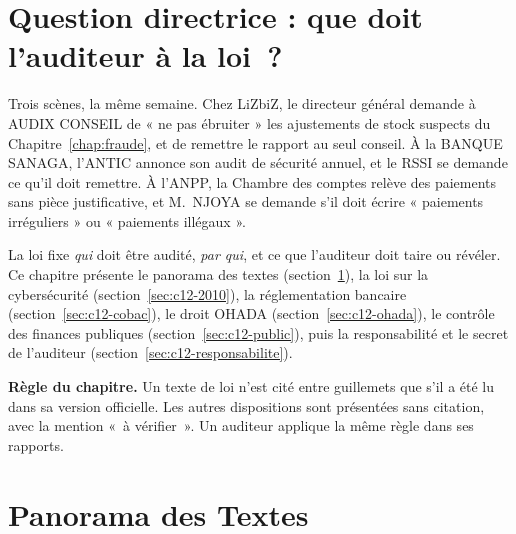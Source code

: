 \bigskip

\section*{Question directrice : que doit l'auditeur à la loi~?}

Trois scènes, la même semaine. Chez LiZbiZ, le directeur général demande à
AUDIX CONSEIL de « ne pas ébruiter » les ajustements de stock suspects
du Chapitre~\ref{chap:fraude}, et de remettre le rapport au seul conseil.
À la BANQUE SANAGA, l'ANTIC annonce son audit de sécurité annuel, et le RSSI
se demande ce qu'il doit remettre. À l'ANPP, la Chambre des comptes relève
des paiements sans pièce justificative, et M.~NJOYA se demande s'il doit
écrire « paiements irréguliers » ou « paiements illégaux ».

La loi fixe \emph{qui} doit être audité, \emph{par qui}, et ce que l'auditeur
doit taire ou révéler. Ce chapitre présente le panorama des textes
(section~\ref{sec:c12-panorama}), la loi sur la cybersécurité
(section~\ref{sec:c12-2010}), la réglementation bancaire
(section~\ref{sec:c12-cobac}), le droit OHADA
(section~\ref{sec:c12-ohada}), le contrôle des finances publiques
(section~\ref{sec:c12-public}), puis la responsabilité et le secret de
l'auditeur (section~\ref{sec:c12-responsabilite}).

\begin{boxalert}
\textbf{Règle du chapitre.} Un texte de loi n'est cité entre guillemets
que s'il a été lu dans sa version officielle. Les autres dispositions sont
présentées sans citation, avec la mention «~à vérifier~». Un auditeur
applique la même règle dans ses rapports.
\end{boxalert}

\separateur

\section{Panorama des Textes}
\label{sec:c12-panorama}

